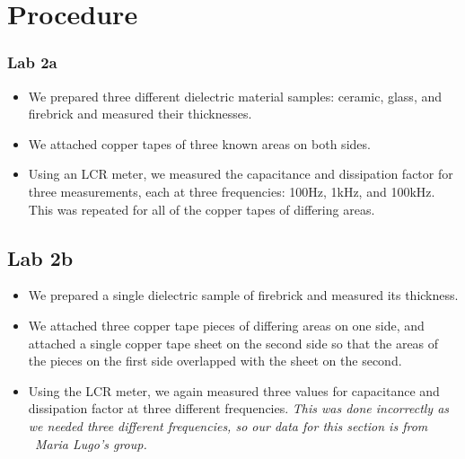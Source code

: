 \documentclass{article}
\begin{document}
\section*{Procedure}
\subsubsection*{Lab 2a}
\begin{itemize}
\item We prepared three different dielectric material samples: ceramic, glass, and firebrick and measured their thicknesses.
\item We attached copper tapes of three known areas on both sides.
\item Using an LCR meter, we measured the capacitance and dissipation factor for three measurements, each at three frequencies: 100Hz, 1kHz, and 100kHz. This was repeated for all of the copper tapes of differing areas.
\end{itemize}
\subsection*{Lab 2b}
\begin{itemize}
\item We prepared a single dielectric sample of firebrick and measured its thickness.
\item We attached three copper tape pieces of differing areas on one side, and attached a single copper tape sheet on the second side so that the areas of the pieces on the first side overlapped with the sheet on the second.
\item Using the LCR meter, we again measured three values for capacitance and dissipation factor at three different frequencies. \textit{This was done incorrectly as we needed three different frequencies, so our data for this section is from \ Maria Lugo's group.}
\end{itemize}
\end{document}
